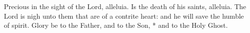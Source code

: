 Precious in the sight of the Lord, alleluia.
\versseparator
Is the death of his saints, alleluia.
\versseparator
The Lord is nigh unto them that are of a contrite heart: and he will save the humble of spirit.
\versseparator
Glory be to the Father, and to the Son, * and to the Holy Ghost.
